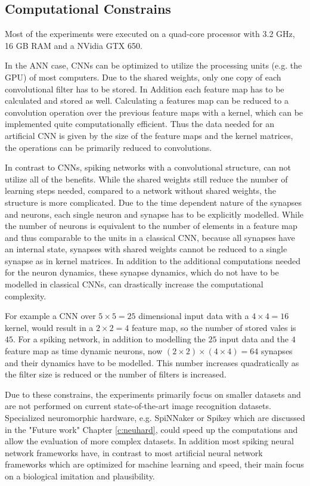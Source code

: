 \subsection{Computational Constrains} \label{c:compconstr}

Most of the experiments were executed on a quad-core processor with 3.2 GHz, 16 GB RAM and a NVidia GTX 650.

In the ANN case, CNNs can be optimized to utilize the processing units (e.g. the GPU) of most computers. 
Due to the shared weights, only one copy of each convolutional filter has to be stored. 
In Addition each feature map has to be calculated and stored as well.
Calculating a features map can be reduced to a convolution operation over the previous feature maps with a kernel, which can be implemented quite computationally efficient.
Thus the data needed for an artificial CNN is given by the size of the feature maps and the kernel matrices, the operations can be primarily reduced to convolutions.  

In contrast to CNNs, spiking networks with a convolutional structure, can not utilize all of the benefits.
While the shared weights still reduce the number of learning steps needed, compared to a network without shared weights, the structure is more complicated.
Due to the time dependent nature of the synapses and neurons, each single neuron and synapse has to be explicitly modelled.
While the number of neurons is equivalent to the number of elements in a feature map and thus comparable to the units in a classical CNN, because all synapses have an internal state, synapses with shared weights cannot be reduced to a single synapse as in kernel matrices.
In addition to the additional computations needed for the neuron dynamics, these synapse dynamics, which do not have to be modelled in classical CNNs, can drastically increase the computational complexity.   

For example a CNN over $5 \times 5 = 25$ dimensional input data with a $4 \times 4 = 16$ kernel, would result in a $2 \times 2 = 4$ feature map, so the number of stored vales is $45$. 
For a spiking network, in addition to modelling the $25$ input data and the $4$ feature map as time dynamic neurons, now $(2 \times 2) \times (4 \times 4) = 64$ synapses and their dynamics have to be modelled.
This number increases quadratically as the filter size is reduced or the number of filters is increased.

Due to these constrains, the experiments primarily focus on smaller datasets and are not performed on current state-of-the-art image recognition datasets. 
Specialized neuromorphic hardware, e.g. SpiNNaker or Spikey which are discussed in the "Future work" Chapter \ref{c:neuhard}, could speed up the computations and allow the evaluation of more complex datasets.  
In addition most spiking neural network frameworks have, in contrast to most artificial neural network frameworks which are optimized for machine learning and speed, their main focus on a biological imitation and plausibility.


